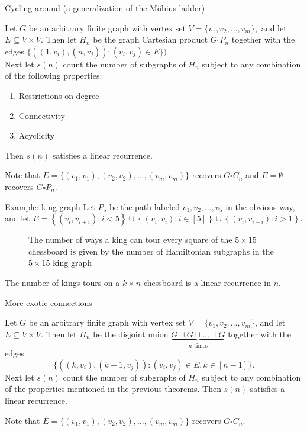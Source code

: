 \documentclass{beamer}%
\newcommand\set[1]{\left\{#1\right\}}
\begin{document}
\begin{frame}{Cycling around (a generalization of the M\"obius ladder)}
  \begin{theorem}
    Let $G$ be an arbitrary finite graph with vertex set
    $V = \{ v_1, v_2, \hdots, v_m \},$
    and let $E \subseteq V \times V$.
    Then let $H_n$ be the graph Cartesian product $G \square P_n$ together with
    the edges $\{((1, v_i), (n, v_j)) : (v_i, v_j) \in E\})$
    \\
    Next let $s(n)$ count the number of subgraphs of $H_n$
    subject to any combination of the following properties:
    \begin{enumerate}
      \item Restrictions on degree
      \item Connectivity
      \item Acyclicity
    \end{enumerate}
    Then $s(n)$ satisfies a linear recurrence.
  \end{theorem}
  Note that $E = \{(v_1, v_1), (v_2, v_2), \hdots, (v_m, v_m)\}$ recovers
  $G \square C_n$ and $E = \emptyset$ recovers $G \square P_n$.
\end{frame}

\begin{frame}{Example: king graph}
  Let $P_5$ be the path labeled $v_1, v_2, \hdots, v_5$ in the obvious way, and let
  $E = \set{(v_i, v_{i+i}) : i < 5} \cup \set{(v_i, v_{i}) : i \in [5]} \cup \set{(v_i, v_{i-i}) : i > 1}$.
  \begin{figure}
    
    \caption{
      The number of ways a king can tour every square of the
      $5 \times 15$ chessboard is given by the number of Hamiltonian
      subgraphs in the $5 \times 15$ king graph
    }
  \end{figure}
  The number of kings tours on a $k \times n$ chessboard is a linear
  recurrence in $n$.
\end{frame}

\begin{frame}{More exotic connections}
  \begin{theorem}
    Let $G$ be an arbitrary finite graph with vertex set
    $V = \{ v_1, v_2, \hdots, v_m \}$, and let $E \subseteq V \times V$.
    Then let $H_n$ be the disjoint union
    $\underbrace{G \sqcup G \sqcup \hdots \sqcup G}_{n \text{ times}}$ together with the edges \[
      \{((k, v_i), (k + 1, v_j)) : (v_i, v_j) \in E, k \in [n-1]\}.
    \]
    Next let $s(n)$ count the number of subgraphs of $H_n$
    subject to any combination of the properties mentioned in the previous theorems.
    Then $s(n)$ satisfies a linear recurrence.
  \end{theorem}
  Note that $E = \{(v_1, v_1), (v_2, v_2), \hdots, (v_m, v_m)\}$ recovers
  $G \square C_n$.
\end{frame}
\end{document}
